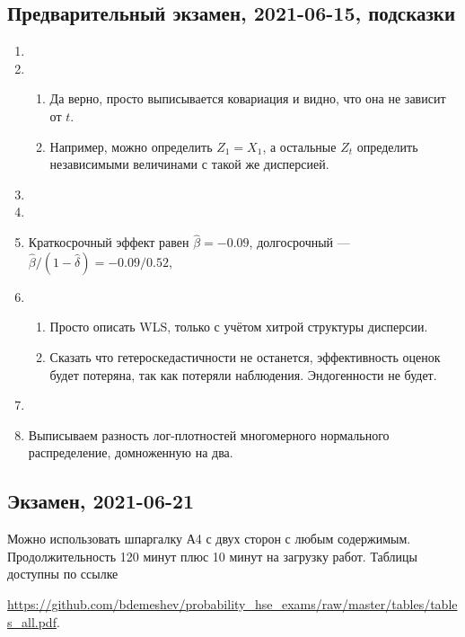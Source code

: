 \subsection{Предварительный экзамен, 2021-06-15, подсказки}

\begin{enumerate}
\item
\item 
\begin{enumerate}
    \item Да верно, просто выписывается ковариация и видно, что она не зависит от $t$.
    \item Например, можно определить $Z_1 = X_1$, а остальные $Z_t$ определить независимыми величинами с такой же дисперсией.
\end{enumerate}
\item
\item

\item Краткосрочный эффект равен $\hat \beta = -0.09$, долгосрочный — $\hat \beta/(1 - \hat\delta) = -0.09 / 0.52$, 
\item \begin{enumerate}
    \item Просто описать WLS, только с учётом хитрой структуры дисперсии.
    \item Сказать что гетероскедастичности не останется, эффективность оценок будет потеряна, так как потеряли наблюдения. Эндогенности не будет.
\end{enumerate}
\item
\item Выписываем разность лог-плотностей многомерного нормального распределение, домноженную на два.
\end{enumerate}


\subsection{Экзамен, 2021-06-21}

Можно использовать шпаргалку А4 с двух сторон с любым содержимым. Продолжительность 120 минут плюс 10 минут на загрузку работ.
Таблицы доступны по ссылке

\url{https://github.com/bdemeshev/probability_hse_exams/raw/master/tables/tables_all.pdf}.




